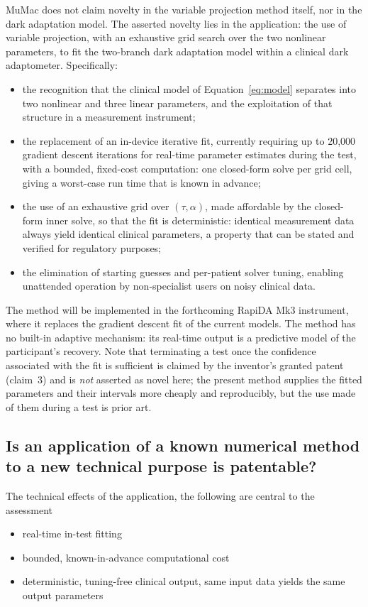 \documentclass[11pt,a4paper]{article}
\begin{document}
MuMac does not claim novelty in the variable projection method itself, nor
in the dark adaptation model. The asserted novelty lies in the
application: the use of variable projection, with an exhaustive grid
search over the two nonlinear parameters, to fit the two-branch dark
adaptation model within a clinical dark adaptometer. Specifically:
\begin{itemize}[nosep]
\item the recognition that the clinical model of
  Equation~\eqref{eq:model} separates into two nonlinear and three linear
  parameters, and the exploitation of that structure in a measurement
  instrument;
\item the replacement of an in-device iterative fit, currently requiring
  up to 20{,}000 gradient descent iterations for real-time parameter
  estimates during the test, with a bounded, fixed-cost computation:
  one closed-form solve per grid cell, giving a worst-case run time that
  is known in advance;
\item the use of an exhaustive grid over $(\tau,\alpha)$, made affordable
  by the closed-form inner solve, so that the fit is deterministic:
  identical measurement data always yield identical clinical parameters,
  a property that can be stated and verified for regulatory purposes;
\item the elimination of starting guesses and per-patient solver tuning,
  enabling unattended operation by non-specialist users on noisy clinical
  data.
\end{itemize}
The method will be implemented in the forthcoming RapiDA Mk3 instrument,
where it replaces the gradient descent fit of the current models. The
method has no built-in adaptive mechanism: its real-time output is a
predictive model of the participant's recovery. Note that terminating a
test once the confidence associated with the fit is sufficient is claimed
by the inventor's granted patent (claim~3) and is \emph{not} asserted as
novel here; the present method supplies the fitted parameters and their
intervals more cheaply and reproducibly, but the use made of them during
a test is prior art.

\subsection*{Is an application of a known numerical method to a new technical
purpose is patentable?}
The technical effects of the application, the following are central to the assessment 
\begin{itemize}
\item real-time in-test fitting
\item  bounded, known-in-advance computational cost
\item deterministic, tuning-free clinical output, same input data yields the same output parameters
\end{itemize}
\end{document}
